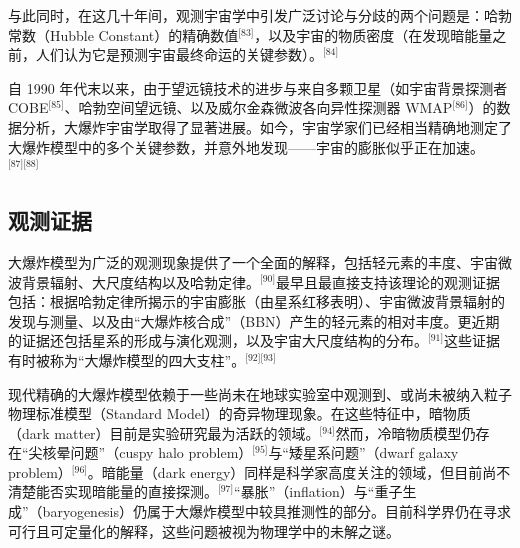 与此同时，在这几十年间，观测宇宙学中引发广泛讨论与分歧的两个问题是：哈勃常数（Hubble Constant）的精确数值\(^\text{[83]}\)，以及宇宙的物质密度（在发现暗能量之前，人们认为它是预测宇宙最终命运的关键参数）。\(^\text{[84]}\)

自 1990 年代末以来，由于望远镜技术的进步与来自多颗卫星（如宇宙背景探测者 COBE\(^\text{[85]}\)、哈勃空间望远镜、以及威尔金森微波各向异性探测器 WMAP\(^\text{[86]}\)）的数据分析，大爆炸宇宙学取得了显著进展。如今，宇宙学家们已经相当精确地测定了大爆炸模型中的多个关键参数，并意外地发现——宇宙的膨胀似乎正在加速。\(^\text{[87][88]}\)
\subsection{观测证据}
大爆炸模型为广泛的观测现象提供了一个全面的解释，包括轻元素的丰度、宇宙微波背景辐射、大尺度结构以及哈勃定律。\(^\text{[90]}\)最早且最直接支持该理论的观测证据包括：根据哈勃定律所揭示的宇宙膨胀（由星系红移表明）、宇宙微波背景辐射的发现与测量、以及由“大爆炸核合成”（BBN）产生的轻元素的相对丰度。更近期的证据还包括星系的形成与演化观测，以及宇宙大尺度结构的分布。\(^\text{[91]}\)这些证据有时被称为“大爆炸模型的四大支柱”。\(^\text{[92][93]}\)

现代精确的大爆炸模型依赖于一些尚未在地球实验室中观测到、或尚未被纳入粒子物理标准模型（Standard Model）的奇异物理现象。在这些特征中，暗物质（dark matter）目前是实验研究最为活跃的领域。\(^\text{[94]}\)然而，冷暗物质模型仍存在“尖核晕问题”（cuspy halo problem）\(^\text{[95]}\)与“矮星系问题”（dwarf galaxy problem）\(^\text{[96]}\)。暗能量（dark energy）同样是科学家高度关注的领域，但目前尚不清楚能否实现暗能量的直接探测。\(^\text{[97]}\)“暴胀”（inflation）与“重子生成”（baryogenesis）仍属于大爆炸模型中较具推测性的部分。目前科学界仍在寻求可行且可定量化的解释，这些问题被视为物理学中的未解之谜。
